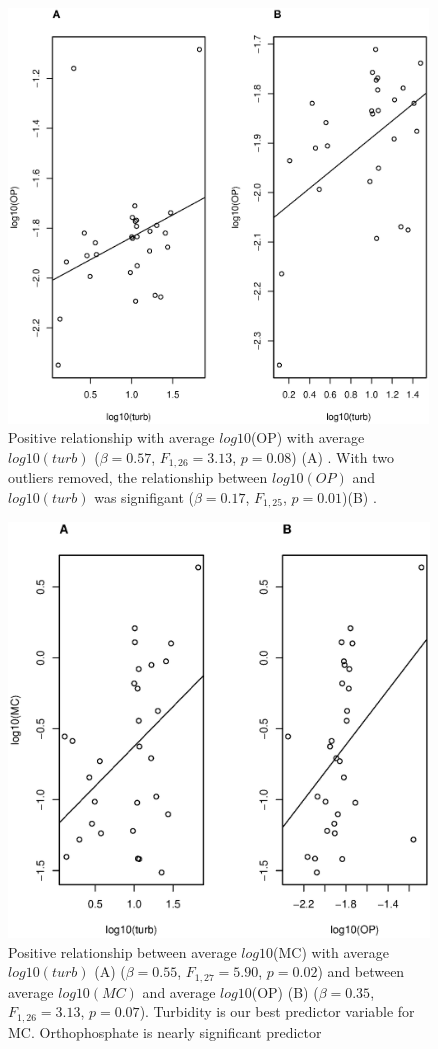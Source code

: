 \begin{figure}
\includegraphics[width=\textwidth, height=11cm]{figures/plot1}
\caption{Positive relationship with average $log10$(OP) with average $log10(turb)$ ($\beta=0.57$, $F_{{1,26}}=3.13$, $p=0.08$) (A) . With two outliers removed, the relationship between $log10(OP)$ and $log10(turb)$ was signifigant  ($\beta=0.17$, $F_{{1,25}}$, $p=0.01$)(B) . }
\label{fig:plot1}
\end{figure}

\begin{figure}
\includegraphics[width=\textwidth, height=11cm]{figures/plot2}
\caption{Positive relationship between average $log10$(MC) with average $log10(turb)$ (A) ($\beta=0.55$, $F_{{1,27}}=5.90$, $p=0.02$) and between average $log10(MC)$ and average  $log10$(OP) (B) ($\beta=0.35$, $F_{{1,26}}=3.13$, $p=0.07$). Turbidity is our best predictor variable for MC. Orthophosphate is nearly significant predictor}
\label{fig:plot2}
\end{figure}





